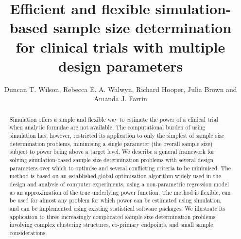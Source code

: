 \documentclass[sagev, doublespace, Crown]{sagej}
\begin{document}

\title{Efficient and flexible simulation-based sample size determination for clinical trials with multiple design parameters}

\author{Duncan T. Wilson,
Rebecca E. A. Walwyn, 
Richard Hooper,
Julia Brown and 
Amanda J. Farrin}



\begin{abstract}

Simulation offers a simple and flexible way to estimate the power of a clinical trial when analytic formulae are not available. The computational burden of using simulation has, however, restricted its application to only the simplest of sample size determination problems, minimising a single parameter (the overall sample size) subject to power being above a target level. We describe a general framework for solving simulation-based sample size determination problems with several design parameters over which to optimise and several conflicting criteria to be minimised. The method is based on an established global optimisation algorithm widely used in the design and analysis of computer experiments, using a non-parametric regression model as an approximation of the true underlying power function. The method is flexible, can be used for almost any problem for which power can be estimated using simulation, and can be implemented using existing statistical software packages. We illustrate its application to three increasingly complicated sample size determination problems involving complex clustering structures, co-primary endpoints, and small sample considerations.
\end{abstract}


\maketitle
\end{document}
